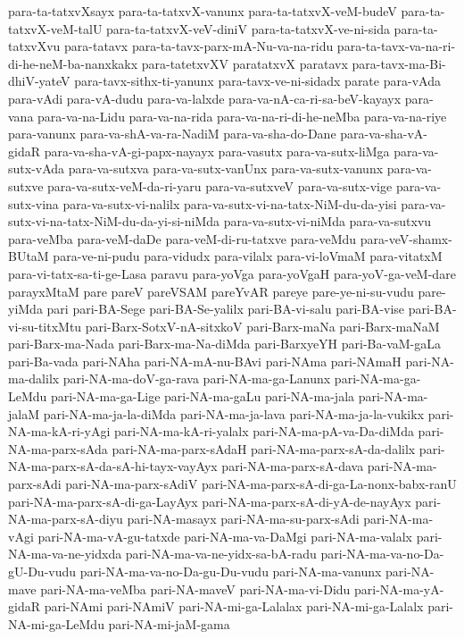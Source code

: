 {para-ta-tatxvXsayx
para-ta-tatxvX-vanunx
para-ta-tatxvX-veM-budeV
para-ta-tatxvX-veM-talU
para-ta-tatxvX-veV-diniV
para-ta-tatxvX-ve-ni-sida
para-ta-tatxvXvu
para-tatavx
para-ta-tavx-parx-mA-Nu-va-na-ridu
para-ta-tavx-va-na-ri-di-he-neM-ba-nanxkakx
para-tatetxvXV
paratatxvX
paratavx
para-tavx-ma-Bi-dhiV-yateV
para-tavx-sithx-ti-yanunx
para-tavx-ve-ni-sidadx
parate
para-vAda
para-vAdi
para-vA-dudu
para-va-lalxde
para-va-nA-ca-ri-sa-beV-kayayx
para-vana
para-va-na-Lidu
para-va-na-rida
para-va-na-ri-di-he-neMba
para-va-na-riye
para-vanunx
para-va-shA-va-ra-NadiM
para-va-sha-do-Dane
para-va-sha-vA-gidaR
para-va-sha-vA-gi-papx-nayayx
para-vasutx
para-va-sutx-liMga
para-va-sutx-vAda
para-va-sutxva
para-va-sutx-vanUnx
para-va-sutx-vanunx
para-va-sutxve
para-va-sutx-veM-da-ri-yaru
para-va-sutxveV
para-va-sutx-vige
para-va-sutx-vina
para-va-sutx-vi-nalilx
para-va-sutx-vi-na-tatx-NiM-du-da-yisi
para-va-sutx-vi-na-tatx-NiM-du-da-yi-si-niMda
para-va-sutx-vi-niMda
para-va-sutxvu
para-veMba
para-veM-daDe
para-veM-di-ru-tatxve
para-veMdu
para-veV-shamx-BUtaM
para-ve-ni-pudu
para-vidudx
para-vilalx
para-vi-loVmaM
para-vitatxM
para-vi-tatx-sa-ti-ge-Lasa
paravu
para-yoVga
para-yoVgaH
para-yoV-ga-veM-dare
parayxMtaM
pare
pareV
pareVSAM
pareYvAR
pareye
pare-ye-ni-su-vudu
pare-yiMda
pari
pari-BA-Sege
pari-BA-Se-yalilx
pari-BA-vi-salu
pari-BA-vise
pari-BA-vi-su-titxMtu
pari-Barx-SotxV-nA-sitxkoV
pari-Barx-maNa
pari-Barx-maNaM
pari-Barx-ma-Nada
pari-Barx-ma-Na-diMda
pari-BarxyeYH
pari-Ba-vaM-gaLa
pari-Ba-vada
pari-NAha
pari-NA-mA-nu-BAvi
pari-NAma
pari-NAmaH
pari-NA-ma-dalilx
pari-NA-ma-doV-ga-rava
pari-NA-ma-ga-Lanunx
pari-NA-ma-ga-LeMdu
pari-NA-ma-ga-Lige
pari-NA-ma-gaLu
pari-NA-ma-jala
pari-NA-ma-jalaM
pari-NA-ma-ja-la-diMda
pari-NA-ma-ja-lava
pari-NA-ma-ja-la-vukikx
pari-NA-ma-kA-ri-yAgi
pari-NA-ma-kA-ri-yalalx
pari-NA-ma-pA-va-Da-diMda
pari-NA-ma-parx-sAda
pari-NA-ma-parx-sAdaH
pari-NA-ma-parx-sA-da-dalilx
pari-NA-ma-parx-sA-da-sA-hi-tayx-vayAyx
pari-NA-ma-parx-sA-dava
pari-NA-ma-parx-sAdi
pari-NA-ma-parx-sAdiV
pari-NA-ma-parx-sA-di-ga-La-nonx-babx-ranU
pari-NA-ma-parx-sA-di-ga-LayAyx
pari-NA-ma-parx-sA-di-yA-de-nayAyx
pari-NA-ma-parx-sA-diyu
pari-NA-masayx
pari-NA-ma-su-parx-sAdi
pari-NA-ma-vAgi
pari-NA-ma-vA-gu-tatxde
pari-NA-ma-va-DaMgi
pari-NA-ma-valalx
pari-NA-ma-va-ne-yidxda
pari-NA-ma-va-ne-yidx-sa-bA-radu
pari-NA-ma-va-no-Da-gU-Du-vudu
pari-NA-ma-va-no-Da-gu-Du-vudu
pari-NA-ma-vanunx
pari-NA-mave
pari-NA-ma-veMba
pari-NA-maveV
pari-NA-ma-vi-Didu
pari-NA-ma-yA-gidaR
pari-NAmi
pari-NAmiV
pari-NA-mi-ga-Lalalax
pari-NA-mi-ga-Lalalx
pari-NA-mi-ga-LeMdu
pari-NA-mi-jaM-gama
}
